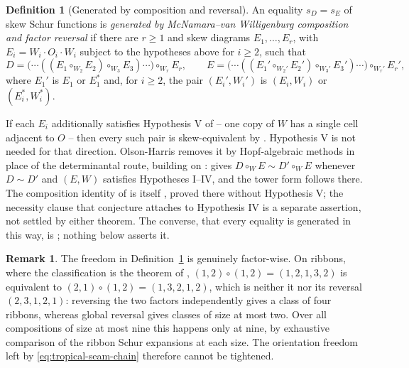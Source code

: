 \documentclass[11pt,a4paper]{amsart}
\numberwithin{equation}{section}
\theoremstyle{plain}
\theoremstyle{definition}
\newtheorem{definition}[theorem]{Definition}
\newtheorem{remark}[theorem]{Remark}
\begin{document}
\begin{definition}[Generated by composition and reversal]\label{def:generated}
An equality \(s_D=s_E\) of skew Schur functions is \emph{generated by McNamara--van Willigenburg composition and factor reversal} if there are \(r\ge1\) and skew diagrams \(E_1,\ldots,E_r\), with \(E_i=W_i\!\cdot\!O_i\!\cdot\!W_i\) subject to the hypotheses above for \(i\ge2\), such that
\[
D=\bigl(\cdots((E_1\circ_{W_2}E_2)\circ_{W_3}E_3)\cdots\bigr)\circ_{W_r}E_r,
\qquad
E=\bigl(\cdots((E_1'\circ_{W_2'}E_2')\circ_{W_3'}E_3')\cdots\bigr)\circ_{W_r'}E_r',
\]
where \(E_1'\) is \(E_1\) or \(E_1^{*}\) and, for \(i\ge2\), the pair \((E_i',W_i')\) is \((E_i,W_i)\) or \((E_i^{*},W_i^{*})\).
\end{definition}

If each \(E_i\) additionally satisfies Hypothesis V of \cite[Hyp.~3.27]{McNamara2009Classification} -- one copy of \(W\) has a single cell adjacent to \(O\) -- then every such pair is skew-equivalent by \cite[Thm.~5.3]{McNamara2009Classification}.  Hypothesis V is not needed for that direction.  Olson-Harris removes it by Hopf-algebraic methods in place of the determinantal route, building on \cite{Yeats2017HopfSchur}: \cite[Thm.~5.3.9]{OlsonHarris2024HopfApplications} gives \(D\circ_WE\sim D'\circ_WE\) whenever \(D\sim D'\) and \((E,W)\) satisfies Hypotheses I--IV, and the tower form follows there.  The composition identity of \cite[Conj.~3.26]{McNamara2009Classification} is itself \cite[Thm.~5.6.4]{OlsonHarris2024HopfApplications}, proved there without Hypothesis V; the necessity clause that conjecture attaches to Hypothesis IV is a separate assertion, not settled by either theorem.  The converse, that every equality is generated in this way, is \cite[Conj.~5.7]{McNamara2009Classification}; nothing below asserts it.

\begin{remark}\label{rem:factorwise}
The freedom in Definition~\ref{def:generated} is genuinely factor-wise.  On ribbons, where the classification is the theorem of \cite{Billera2006DecomposableCompositions}, \((1,2)\circ(1,2)=(1,2,1,3,2)\) is equivalent to \((2,1)\circ(1,2)=(1,3,2,1,2)\), which is neither it nor its reversal \((2,3,1,2,1)\): reversing the two factors independently gives a class of four ribbons, whereas global reversal gives classes of size at most two.  Over all compositions of size at most nine this happens only at nine, by exhaustive comparison of the ribbon Schur expansions at each size.  The orientation freedom left by \eqref{eq:tropical-seam-chain} therefore cannot be tightened.
\end{remark}
\end{document}
